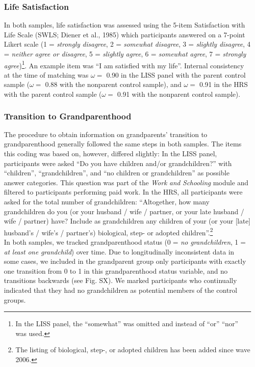 \documentclass[
  english,
  man, noextraspace]{apa7}
\begin{document}
\hypertarget{life-satisfaction}{%
\subsubsection{Life Satisfaction}\label{life-satisfaction}}

In both samples, life satisfaction was assessed using the 5-item Satisfaction with Life Scale (SWLS; Diener et al., 1985) which participants answered on a 7-point Likert scale (1 = \emph{strongly disagree}, 2 = \emph{somewhat disagree}, 3 = \emph{slightly disagree}, 4 = \emph{neither agree or disagree}, 5 = \emph{slightly agree}, 6 = \emph{somewhat agree}, 7 = \emph{strongly agree})\footnote{In the LISS panel, the \enquote{somewhat} was omitted and instead of \enquote{or} \enquote{nor} was used.}. An example item was \enquote{I am satisfied with my life}. Internal consistency at the time of matching was \(\omega =\) 0.90 in the LISS panel with the parent control sample (\(\omega =\) 0.88 with the nonparent control sample), and \(\omega =\) 0.91 in the HRS with the parent control sample (\(\omega =\) 0.91 with the nonparent control sample).

\hypertarget{transition-to-grandparenthood}{%
\subsubsection{Transition to Grandparenthood}\label{transition-to-grandparenthood}}

The procedure to obtain information on grandparents' transition to grandparenthood generally followed the same steps in both samples. The items this coding was based on, however, differed slightly: In the LISS panel, participants were asked \enquote{Do you have children and/or grandchildren?} with \enquote{children}, \enquote{grandchildren}, and \enquote{no children or grandchildren} as possible answer categories. This question was part of the \emph{Work and Schooling} module and filtered to participants performing paid work. In the HRS, all participants were asked for the total number of grandchildren: \enquote{Altogether, how many grandchildren do you (or your husband / wife / partner, or your late husband / wife / partner) have? Include as grandchildren any children of your (or your {[}late{]} husband's / wife's / partner's) biological, step- or adopted children}.\footnote{The listing of biological, step-, or adopted children has been added since wave 2006.}\\
In both samples, we tracked grandparenthood status (0 = \emph{no grandchildren}, 1 = \emph{at least one grandchild}) over time. Due to longitudinally inconsistent data in some cases, we included in the grandparent group only participants with exactly one transition from 0 to 1 in this grandparenthood status variable, and no transitions backwards (see Fig. SX). We marked participants who continually indicated that they had no grandchildren as potential members of the control groups.
\end{document}

